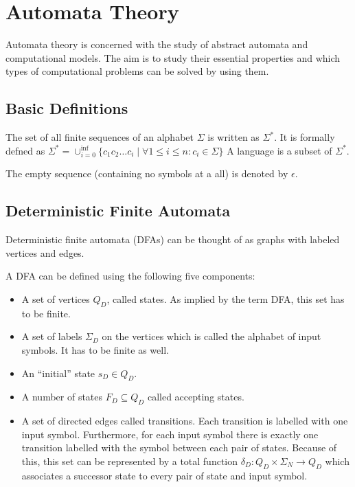 \section{Automata Theory}

Automata theory is concerned with the study of abstract automata and computational models.
The aim is to study their essential properties and which types of computational problems can be solved by using them.

\subsection{Basic Definitions}

\begin{definition}
    The set of all finite sequences of an alphabet $\Sigma$ is written as $\Sigma^\ast$.
    It is formally defned as
    $\Sigma^\ast = \cup_{i=0}^{\inf} \{c_1 c_2 \ldots c_i \mid \forall 1 \le i \le n: c_i \in \Sigma \} $
    A language is a subset of $\Sigma^\ast$.
\end{definition}

The empty sequence (containing no symbols at a all) is denoted by $\epsilon$.

\subsection{Deterministic Finite Automata}

Deterministic finite automata (DFAs) can be thought of as graphs with labeled vertices and edges.

\begin{definition}
    A DFA can be defined using the following five components:

    \begin{itemize}
        \item A set of vertices $Q_D$, called states.
        As implied by the term DFA, this set has to be finite.
        \item A set of labels $\Sigma_D$ on the vertices which is called the alphabet of input symbols.
        It has to be finite as well.
        \item An ``initial'' state $s_D \in Q_D$.
        \item A number of states $F_D \subseteq Q_D$ called accepting states.
        \item A set of directed edges called transitions.
        Each transition is labelled with one input symbol.
        Furthermore, for each input symbol there is exactly one transition labelled with
        the symbol between each pair of states.
        Because of this, this set can be represented by a total function
        $\delta_D : Q_D \times \Sigma_N \rightarrow Q_D$ which associates a successor state to
        every pair of state and input symbol.
    \end{itemize}
\end{definition}

